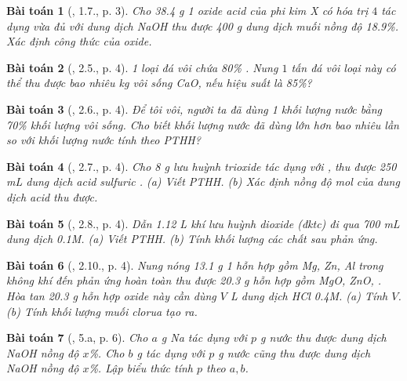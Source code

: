 \documentclass{article}
\newtheorem{baitoan}{Bài toán}
\begin{document}
\begin{baitoan}[\cite{SBT_Hoa_Hoc_9}, 1.7., p. 3]
	Cho \emph{38.4 g} 1 oxide acid của phi kim X có hóa trị $4$ tác dụng vừa đủ với dung dịch \emph{NaOH} thu được \emph{400 g} dung dịch muối nồng độ \emph{18.9\%}. Xác định công thức của oxide.
\end{baitoan}

\begin{baitoan}[\cite{SBT_Hoa_Hoc_9}, 2.5., p. 4]
	1 loại đá vôi chứa \emph{80\% }. Nung $1$ tấn đá vôi loại này có thể thu được bao nhiêu \emph{kg} vôi sống \emph{CaO}, nếu hiệu suất là \emph{85\%}?
\end{baitoan}

\begin{baitoan}[\cite{SBT_Hoa_Hoc_9}, 2.6., p. 4]
	Để tôi vôi, người ta đã dùng 1 khối lượng nước bằng \emph{70\%} khối lượng vôi sống. Cho biết khối lượng nước đã dùng lớn hơn bao nhiêu lần so với khối lượng nước tính theo PTHH?
\end{baitoan}

\begin{baitoan}[\cite{SBT_Hoa_Hoc_9}, 2.7., p. 4]
	Cho \emph{8 g} lưu huỳnh trioxide \emph{} tác dụng với \emph{}, thu được \emph{250 mL} dung dịch acid sulfuric \emph{}. (a) Viết PTHH. (b) Xác định nồng độ mol của dung dịch acid thu được.
\end{baitoan}

\begin{baitoan}[\cite{SBT_Hoa_Hoc_9}, 2.8., p. 4]
	Dẫn \emph{1.12 L} khí lưu huỳnh dioxide (đktc) đi qua \emph{700 mL} dung dịch \emph{ 0.1M}. (a) Viết PTHH. (b) Tính khối lượng các chất sau phản ứng.
\end{baitoan}

\begin{baitoan}[\cite{SBT_Hoa_Hoc_9}, 2.10., p. 4]
	Nung nóng \emph{13.1 g} 1 hỗn hợp gồm \emph{Mg, Zn, Al} trong không khí đến phản ứng hoàn toàn thu được \emph{20.3 g} hỗn hợp gồm \emph{MgO, ZnO, }. Hòa tan \emph{20.3 g} hỗn hợp oxide này cần dùng $V$ \emph{L} dung dịch \emph{HCl 0.4M}. (a) Tính $V$. (b) Tính khối lượng muối clorua tạo ra.
\end{baitoan}

\begin{baitoan}[\cite{An_350_BT_Hoa_Hoc_9}, 5.a, p. 6]
	Cho $a$ \emph{g Na} tác dụng với $p$ \emph{g} nước thu được dung dịch \emph{NaOH} nồng độ $x$\%. Cho $b$ \emph{g } tác dụng với $p$ \emph{g} nước cũng thu được dung dịch \emph{NaOH} nồng độ $x$\%. Lập biểu thức tính $p$ theo $a,b$.
\end{baitoan}
\end{document}
